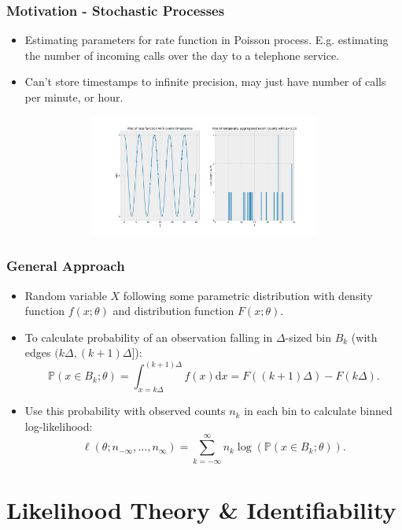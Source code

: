 \documentclass[11pt]{beamer}
\begin{document}
\begin{frame}
	\frametitle{Motivation - Stochastic Processes}
		\begin{itemize}
			\item Estimating parameters for rate function in Poisson process. E.g. estimating the number of incoming calls over the day to a telephone service.
			\item Can't store timestamps to infinite precision, may just have number of calls per minute, or hour.
		\end{itemize}
		\centering
		\begin{figure}[!h]
			\includegraphics[height=4cm, width=12cm]{nhpp_periodic.pdf}
			\centering
		\end{figure}
\end{frame}

\begin{frame}
	\frametitle{General Approach}
	\begin{itemize}
		\item Random variable $X$ following some parametric distribution with density function $f(x; \theta)$ and distribution function $F(x; \theta)$.
		\item To calculate probability of an observation falling in $\Delta$-sized bin $B_k$ (with edges $(k \Delta, (k+1) \Delta]$):
		\begin{equation*}
			\mathbb{P}(x \in B_k; \theta) = \int_{x=k \Delta}^{(k+1)\Delta} f(x) \text{d} x = F((k+1) \Delta) - F(k \Delta).
		\end{equation*}
		\item Use this probability with observed counts $n_k$ in each bin to calculate binned log-likelihood:
		\begin{equation*}
			\ell(\theta; n_{-\infty}, \dots, n_{\infty}) = \sum_{k=-\infty}^\infty n_k \log \left( \mathbb{P}(x \in B_k; \theta) \right).
		\end{equation*}
	\end{itemize}
\end{frame}


\section{Likelihood Theory \& Identifiability}
\end{document}
